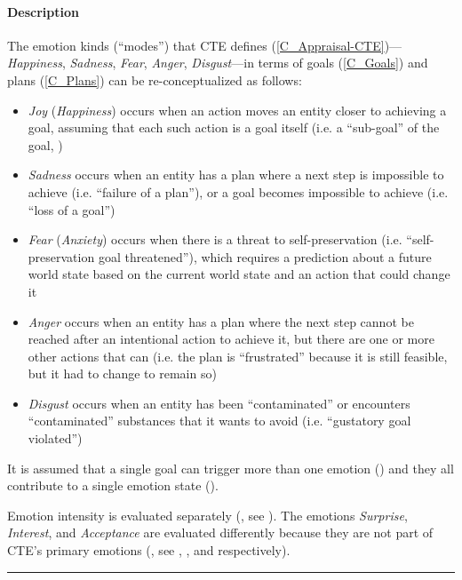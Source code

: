 \paragraph{Description} The emotion kinds (``modes'') that CTE defines
(\cref{C_Appraisal-CTE})---\textit{Happiness}, \textit{Sadness}, \textit{Fear},
\textit{Anger}, \textit{Disgust}---in terms of goals (\cref{C_Goals}) and plans
(\cref{C_Plans}) can be re-conceptualized as follows:
\begin{itemize}
    \item \textit{Joy} (\textit{Happiness}) occurs when an action moves an
    entity closer to achieving a goal, assuming that each such action is a goal
    itself (i.e. a ``sub-goal'' of the goal, )

    \item \textit{Sadness} occurs when an entity has a plan where a next step
    is impossible to achieve (i.e. ``failure of a plan''), or a goal becomes
    impossible to achieve (i.e. ``loss of a goal'')

    \item \textit{Fear} (\textit{Anxiety}) occurs when there is a threat to
    self-preservation (i.e. ``self-preservation goal threatened''), which
    requires a prediction about a future world state based on the current world
    state and an action that could change it

    \item \textit{Anger} occurs when an entity has a plan where the next step
    cannot be reached after an intentional action to achieve it, but there are
    one or more other actions that can (i.e. the plan is ``frustrated'' because
    it is still feasible, but it had to change to remain so)

    \item \textit{Disgust} occurs when an entity has been ``contaminated'' or
    encounters ``contaminated'' substances that it wants to avoid (i.e.
    ``gustatory goal violated'')
\end{itemize}

It is assumed that a single goal can trigger more than one emotion
() and they all contribute to a single emotion state
().

Emotion intensity is evaluated separately (, see
). The emotions \textit{Surprise},
\textit{Interest}, and \textit{Acceptance} are evaluated differently because
they are not part of CTE's primary emotions (, see
, , and
 respectively). \\\hrule

